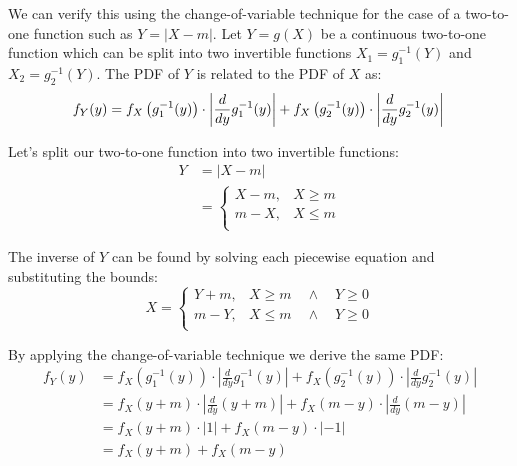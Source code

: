 \documentclass{article}
\begin{document}
We can verify this using the change-of-variable technique for the case of a two-to-one function such as $Y = |X - m|$. Let $Y = g(X)$ be a continuous two-to-one function which can be split into two invertible functions $X_1 = g_1^{-1}(Y)$ and $X_2 = g_2^{-1}(Y)$. The PDF of $Y$ is related to the PDF of $X$ as:
%
\begin{equation}\label{CoV Definition}
f_Y(y) = f_X \left( g_1^{-1}(y) \right)
    \cdot \left| \frac{d}{dy} g_1^{-1}(y) \right|
    + f_X \left( g_2^{-1}(y) \right)
    \cdot \left| \frac{d}{dy} g_2^{-1}(y) \right| \\
\end{equation}

Let's split our two-to-one function into two invertible functions:
%
\begin{equation}\label{Y Piecewise}
\begin{split}
Y &= \lvert X - m \rvert \\
& = \begin{cases}
    X - m, & X \geq m \\
    m - X, & X \leq m \\ 
    \end{cases}
\end{split}
\end{equation}

The inverse of $Y$ can be found by solving each piecewise equation and substituting the bounds:
%
\begin{equation}\label{Inverse Y Piecewise}
X = \begin{cases}
    Y + m, & X \geq m \quad\land\quad Y \geq 0 \\
    m - Y, & X \leq m \quad\land\quad Y \geq 0 \\ 
    \end{cases}
\end{equation}

By applying the change-of-variable technique we derive the same PDF:
%
\begin{equation}\label{AD PDF by CoV}
\begin{split}
f_Y(y) &= f_X \left( g_1^{-1}(y) \right)
    \cdot \left| \frac{d}{dy} g_1^{-1}(y) \right|
    + f_X \left( g_2^{-1}(y) \right)
    \cdot \left| \frac{d}{dy} g_2^{-1}(y) \right| \\
& = f_X(y + m) \cdot \left| \frac{d}{dy} (y+m) \right|
    + f_X(m - y) \cdot \left| \frac{d}{dy} (m - y) \right| \\
& = f_X(y + m) \cdot \lvert 1 \rvert
    + f_X(m - y) \cdot \lvert -1 \rvert \\
& = f_X(y+m) + f_X(m-y)
\end{split}
\end{equation}
\end{document}
